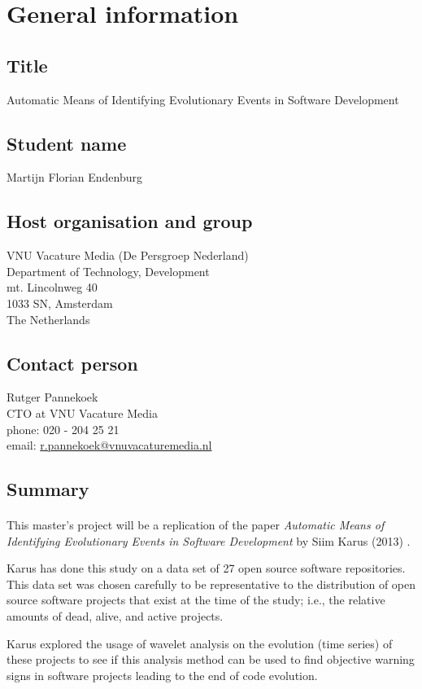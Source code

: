 \section{General information}
\subsection{Title}
Automatic Means of Identifying Evolutionary Events in Software Development

\subsection{Student name}
Martijn Florian Endenburg

\subsection{Host organisation and group}
VNU Vacature Media (De Persgroep Nederland) \\
Department of Technology, Development \\
mt. Lincolnweg 40 \\
1033 SN, Amsterdam \\
The Netherlands

\subsection{Contact person}
Rutger Pannekoek \\
CTO at VNU Vacature Media \\
phone: 020 - 204 25 21 \\
email:
\href{mailto:r.pannekoek@vnuvacaturemedia.nl}{r.pannekoek@vnuvacaturemedia.nl}

\subsection{Summary}
\paragraph{}
This master’s project will be a replication of the paper \emph{Automatic Means
of Identifying Evolutionary Events in Software Development} by Siim Karus
(2013) \cite{karus2013}.

Karus has done this study on a data set of 27 open source software
repositories. This data set was chosen carefully to be representative to the
distribution of open source software projects that exist at the time of the
study; i.e., the relative amounts of dead, alive, and active projects.

Karus explored the usage of wavelet analysis on the evolution (time series) of
these projects to see if this analysis method can be used to find objective
warning signs in software projects leading to the end of code evolution.
